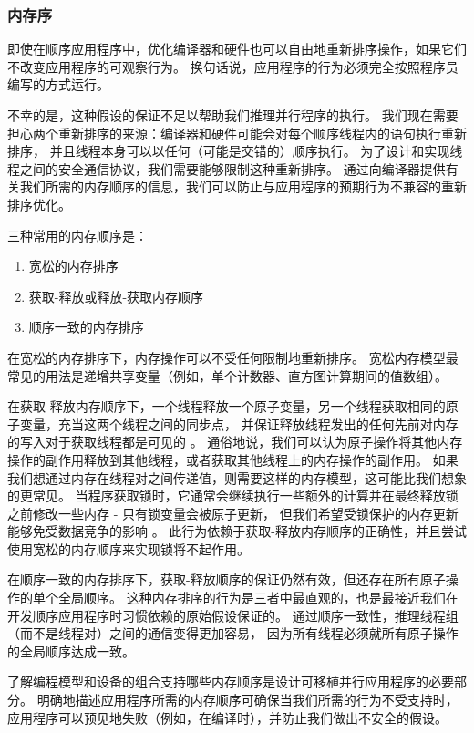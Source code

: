 \subsubsection{内存序}
即使在顺序应用程序中，优化编译器和硬件也可以自由地重新排序操作，如果它们不改变应用程序的可观察行为。 
换句话说，应用程序的行为必须完全按照程序员编写的方式运行。

不幸的是，这种假设的保证不足以帮助我们推理并行程序的执行。 
我们现在需要担心两个重新排序的来源：编译器和硬件可能会对每个顺序线程内的语句执行重新排序，
并且线程本身可以以任何（可能是交错的）顺序执行。 
为了设计和实现线程之间的安全通信协议，我们需要能够限制这种重新排序。 
通过向编译器提供有关我们所需的内存顺序的信息，我们可以防止与应用程序的预期行为不兼容的重新排序优化。

三种常用的内存顺序是：

\begin{enumerate}
	\item 宽松的内存排序

	\item 获取-释放或释放-获取内存顺序

	\item 顺序一致的内存排序
\end{enumerate}

在宽松的内存排序下，内存操作可以不受任何限制地重新排序。 
宽松内存模型最常见的用法是递增共享变量（例如，单个计数器、直方图计算期间的值数组）。

在获取-释放内存顺序下，一个线程释放一个原子变量，另一个线程获取相同的原子变量，充当这两个线程之间的同步点，
并保证释放线程发出的任何先前对内存的写入对于获取线程都是可见的 。 
通俗地说，我们可以认为原子操作将其他内存操作的副作用释放到其他线程，或者获取其他线程上的内存操作的副作用。 
如果我们想通过内存在线程对之间传递值，则需要这样的内存模型，这可能比我们想象的更常见。 
当程序获取锁时，它通常会继续执行一些额外的计算并在最终释放锁之前修改一些内存 - 只有锁变量会被原子更新，
但我们希望受锁保护的内存更新能够免受数据竞争的影响 。 
此行为依赖于获取-释放内存顺序的正确性，并且尝试使用宽松的内存顺序来实现锁将不起作用。

在顺序一致的内存排序下，获取-释放顺序的保证仍然有效，但还存在所有原子操作的单个全局顺序。 
这种内存排序的行为是三者中最直观的，也是最接近我们在开发顺序应用程序时习惯依赖的原始假设保证的。 
通过顺序一致性，推理线程组（而不是线程对）之间的通信变得更加容易，
因为所有线程必须就所有原子操作的全局顺序达成一致。

了解编程模型和设备的组合支持哪些内存顺序是设计可移植并行应用程序的必要部分。 
明确地描述应用程序所需的内存顺序可确保当我们所需的行为不受支持时，
应用程序可以预见地失败（例如，在编译时），并防止我们做出不安全的假设。

